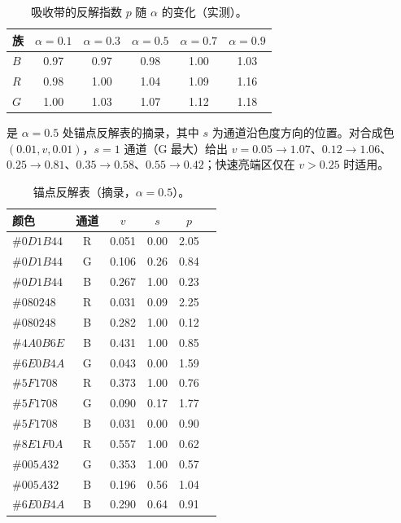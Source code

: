\begin{table}[t]
\centering
\small
\caption{吸收带的反解指数 $p$ 随 $\alpha$ 的变化（实测）。}
\label{tab:d1}
\begin{tabular}{lccccc}
\toprule
族 & $\alpha=0.1$ & $\alpha=0.3$ & $\alpha=0.5$ & $\alpha=0.7$ & $\alpha=0.9$ \\
\midrule
$B$ & 0.97 & 0.97 & 0.98 & 1.00 & 1.03 \\
$R$ & 0.98 & 1.00 & 1.04 & 1.09 & 1.16 \\
$G$ & 1.00 & 1.03 & 1.07 & 1.12 & 1.18 \\
\bottomrule
\end{tabular}
\end{table}

 是 $\alpha=0.5$ 处锚点反解表的摘录，其中 $s$ 为通道沿色度方向的位置。对合成色 $(0.01,v,0.01)$，$s=1$ 通道（G 最大）给出 $v=0.05\rightarrow1.07$、$0.12\rightarrow1.06$、$0.25\rightarrow0.81$、$0.35\rightarrow0.58$、$0.55\rightarrow0.42$；快速亮端区仅在 $v>0.25$ 时适用。

\begin{table}[t]
\centering
\small
\caption{锚点反解表（摘录，$\alpha=0.5$）。}
\label{tab:d2}
\begin{tabular}{lccccc}
\toprule
颜色 & 通道 & $v$ & $s$ & $p$ \\
\midrule
$\#0D1B44$ & R & 0.051 & 0.00 & 2.05 \\
$\#0D1B44$ & G & 0.106 & 0.26 & 0.84 \\
$\#0D1B44$ & B & 0.267 & 1.00 & 0.23 \\
$\#080248$ & R & 0.031 & 0.09 & 2.25 \\
$\#080248$ & B & 0.282 & 1.00 & 0.12 \\
$\#4A0B6E$ & B & 0.431 & 1.00 & 0.85 \\
$\#6E0B4A$ & G & 0.043 & 0.00 & 1.59 \\
$\#5F1708$ & R & 0.373 & 1.00 & 0.76 \\
$\#5F1708$ & G & 0.090 & 0.17 & 1.77 \\
$\#5F1708$ & B & 0.031 & 0.00 & 0.90 \\
$\#8E1F0A$ & R & 0.557 & 1.00 & 0.62 \\
$\#005A32$ & G & 0.353 & 1.00 & 0.57 \\
$\#005A32$ & B & 0.196 & 0.56 & 1.04 \\
$\#6E0B4A$ & B & 0.290 & 0.64 & 0.91 \\
\bottomrule
\end{tabular}
\end{table}

